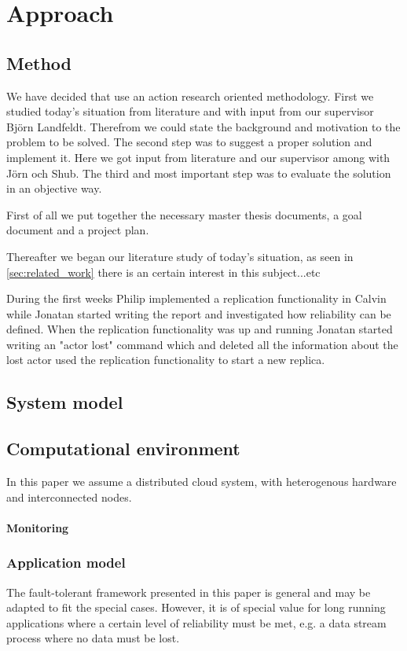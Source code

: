 \documentclass{cslthse-msc}
\begin{document}
\chapter{Approach} \label{ch:approach}

\section{Method} \label{sec:method}
We have decided that use an action research oriented methodology. First we studied today's situation from literature and with input from our supervisor Björn Landfeldt. Therefrom we could state the background and motivation to the problem to be solved.
The second step was to suggest a proper solution and implement it. Here we got input from literature and our supervisor among with Jörn och Shub. The third and most important step was to evaluate the solution in an objective way. %

First of all we put together the necessary master thesis documents, a goal document and a project plan. 

Thereafter we began our literature study of today's situation, as seen in \ref{sec:related_work} there is an certain interest in this subject...etc

During the first weeks Philip implemented a replication functionality in Calvin while Jonatan started writing the report and investigated how reliability can be defined. When the replication functionality was up and running Jonatan started writing an "actor lost" command which and deleted all the information about the lost actor used the replication functionality to start a new replica.
\section{System model}

\section{Computational environment}
In this paper we assume a distributed cloud system, with heterogenous hardware and interconnected nodes.

\subsubsection{Monitoring}

\subsection{Application model}
The fault-tolerant framework presented in this paper is general and may be adapted to fit the special cases. However, it is of special value for long running applications where a certain level of reliability must be met, e.g. a data stream process where no data must be lost.
\end{document}
